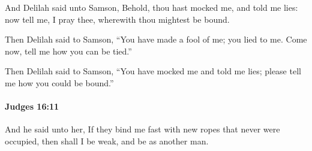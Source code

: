 			\begin{versebox}
					\item[BHS] 
					\item[ASV] And Delilah said unto Samson, Behold, thou hast mocked me, and told me lies: now tell me, I pray thee, wherewith thou mightest be bound.
					\item[NIV] Then Delilah said to Samson, “You have made a fool of me; you lied to me. Come now, tell me how you can be tied.”
					\item[NRSV] Then Delilah said to Samson, “You have mocked me and told me lies; please tell me how you could be bound.”
			\end{versebox}

		\paragraph{Judges 16:11} %
			\label{JUDGES-16-11}

			And he said unto her, If they bind me fast with new ropes that never were occupied, then shall I be weak, and be as another man.

